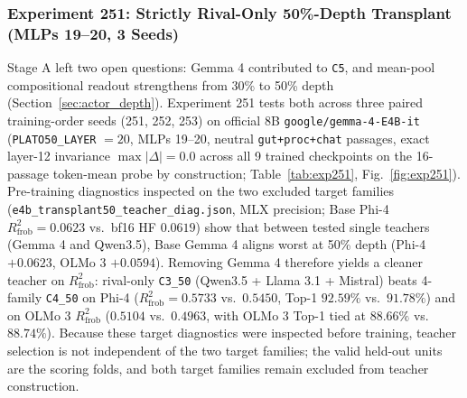 \documentclass[conference]{IEEEtran}
\begin{document}
\subsubsection{Experiment 251: Strictly Rival-Only 50\%-Depth Transplant (MLPs 19--20, 3 Seeds)}
\label{sec:exp251}
Stage A left two open questions: Gemma 4 contributed to \texttt{C5}, and mean-pool compositional readout strengthens from 30\% to 50\% depth (Section~\ref{sec:actor_depth}). Experiment 251 tests both across three paired training-order seeds (251, 252, 253) on official 8B \texttt{google/gemma-4-E4B-it} (\texttt{PLATO50\_LAYER} $=20$, MLPs 19--20, neutral \texttt{gut+proc+chat} passages, exact layer-12 invariance $\max|\Delta|=0.0$ across all 9 trained checkpoints on the 16-passage token-mean probe by construction; Table~\ref{tab:exp251}, Fig.~\ref{fig:exp251}). Pre-training diagnostics inspected on the two excluded target families (\texttt{e4b\_transplant50\_teacher\_diag.json}, MLX precision; Base Phi-4 $R^2_{\text{frob}}=0.0623$ vs.\ bf16 HF $0.0619$) show that between tested single teachers (Gemma 4 and Qwen3.5), Base Gemma 4 aligns worst at 50\% depth (Phi-4 $+0.0623$, OLMo 3 $+0.0594$). Removing Gemma 4 therefore yields a cleaner teacher on $R^2_{\text{frob}}$: rival-only \texttt{C3\_50} (Qwen3.5 + Llama 3.1 + Mistral) beats 4-family \texttt{C4\_50} on Phi-4 ($R^2_{\text{frob}}=0.5733$ vs.\ $0.5450$, Top-1 $92.59\%$ vs.\ $91.78\%$) and on OLMo 3 $R^2_{\text{frob}}$ ($0.5104$ vs.\ $0.4963$, with OLMo 3 Top-1 tied at $88.66\%$ vs.\ $88.74\%$). Because these target diagnostics were inspected before training, teacher selection is not independent of the two target families; the valid held-out units are the scoring folds, and both target families remain excluded from teacher construction.
\end{document}
